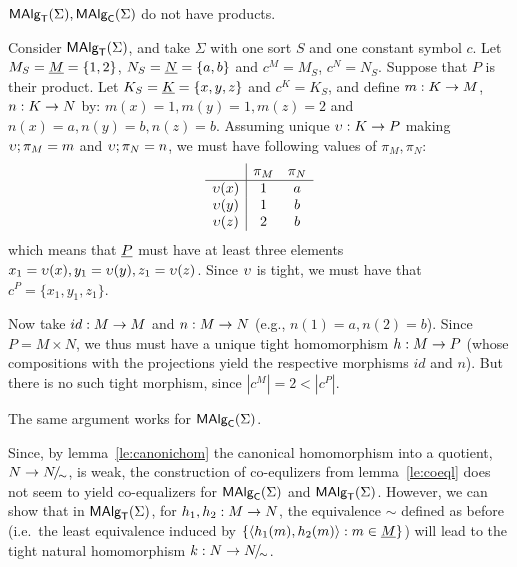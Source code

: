 \documentclass[10pt]{article}
\begin{document}
\begin{Fact}\label{le:noprod}
$\mbox{\rm\sf MAlg}_{\sf T}(\Sigma), \mbox{\rm\sf MAlg}_{\sf C}(\Sigma)$ do not have products.
\end{Fact}

\begin{Proof}
Consider $\mbox{\rm\sf MAlg}_{\sf T}(\Sigma)$, and take $\Sigma$ with one sort $S$ and one constant
symbol $c$.  Let $M_S=\underline {M}=\{1,2\}$, $N_S=\underline {N}=\{a,b\}$ and
$c^{M}=M_S$, $c^{N}=N_S$.  Suppose that $P$ is their product. Let
$K_S=\underline {K}=\{x,y,z\}$ and $c^K=K_S$, and define $m:K\rightarrow M$,
$n:K\rightarrow N$ by: $m(x)=1, m(y)=1, m(z)=2$ and $n(x)=a, n(y)=b,
n(z)=b$. 
Assuming unique $\upsilon:K\rightarrow P$ making $\upsilon;\pi_M=m$
and $\upsilon;\pi_N=n$, we must have following values of $\pi_M,
\pi_N:$ 
{\small { \[ \begin{array}{c|cc} & \pi_M & \pi_N \\ \hline
\upsilon(x) & 1 & a \\ \upsilon(y) & 1 & b \\ \upsilon(z) & 2 & b \end{array} \] }
} which means that $\underline {P}$ must have at least three elements
$x_1=\upsilon(x), y_1=\upsilon(y), z_1=\upsilon(z)$.  Since $\upsilon$ is tight, we
must have that $c^P=\{x_1,y_1,z_1\}$.

Now take $id:M\rightarrow M$ and $n:M\rightarrow N$ (e.g., $n(1)=a,
n(2)=b$). Since $P=M\times N$, we thus must have a unique tight
homomorphism $h:M\rightarrow P$ (whose compositions with the projections
yield the respective morphisms $id$ and $n$). But there is no such
tight morphism, since $|c^M|=2 < |c^P|$.

The same argument works for $\mbox{\rm\sf MAlg}_{\sf C}(\Sigma)$.
\end{Proof}

\noindent
Since, by lemma~\ref{le:canonichom} the canonical homomorphism into a
quotient, $N\rightarrow N\!{\textstyle /}\!_{\sim}$, is weak, the construction of
co-equlizers from lemma~\ref{le:coeql} does not seem to yield
co-equalizers for $\mbox{\rm\sf MAlg}_{\sf C}(\Sigma)$ and $\mbox{\rm\sf MAlg}_{\sf T}(\Sigma)$.  However, we can show that in
$\mbox{\rm\sf MAlg}_{\sf T}(\Sigma)$, for $h_1,h_2:M\rightarrow N$, the equivalence $\sim$ defined as
before (i.e.\ the least equivalence induced by
$\{\langle h_1(m),h_2(m)\rangle:m\in\underline {M}\}$) will lead to the tight
natural homomorphism $k:N\rightarrow N\!{\textstyle /}\!_{\sim}$.
\end{document}
